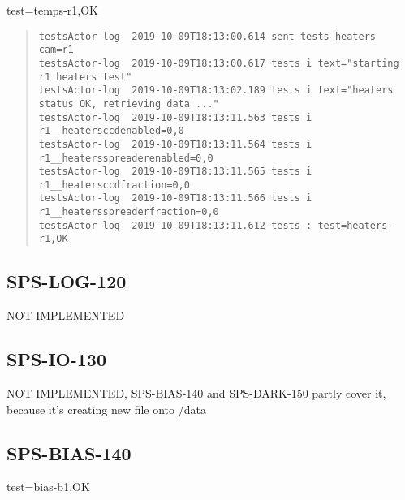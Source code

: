 \noindent test=temps-r1,OK

\begin{quote}
\begin{tiny}
\begin{verbatim}
testsActor-log  2019-10-09T18:13:00.614 sent tests heaters cam=r1
testsActor-log  2019-10-09T18:13:00.617 tests i text="starting r1 heaters test"
testsActor-log  2019-10-09T18:13:02.189 tests i text="heaters status OK, retrieving data ..."
testsActor-log  2019-10-09T18:13:11.563 tests i r1__heatersccdenabled=0,0
testsActor-log  2019-10-09T18:13:11.564 tests i r1__heatersspreaderenabled=0,0
testsActor-log  2019-10-09T18:13:11.565 tests i r1__heatersccdfraction=0,0
testsActor-log  2019-10-09T18:13:11.566 tests i r1__heatersspreaderfraction=0,0
testsActor-log  2019-10-09T18:13:11.612 tests : test=heaters-r1,OK
\end{verbatim}
\end{tiny}
\end{quote}

\subsection{SPS-LOG-120}
\label{sec:tc-120}
NOT IMPLEMENTED
\subsection{SPS-IO-130}
\label{sec:tc-130}
NOT IMPLEMENTED, SPS-BIAS-140 and SPS-DARK-150 partly cover it, because it's creating new file onto /data

\subsection{SPS-BIAS-140}
\label{sec:tc-140}

test=bias-b1,OK

